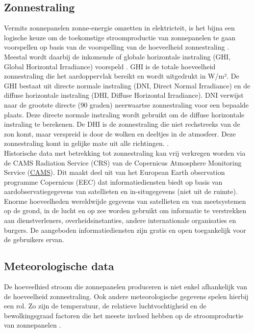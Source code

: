 \subsection{Zonnestraling}

Vermits zonnepanelen zonne-energie omzetten in elektricteit, is het bijna een logische keuze om de toekomstige stroomproductie van zonnepanelen te gaan voorspellen op basis van de voorspelling van de hoeveelheid zonnestraling \autocite{Ledmaoui2023}. Meestal wordt daarbij de inkomende of globale horizontale instraling (GHI, Global Horizontal Irradiance) voorspeld . GHI is de totale hoeveelheid zonnestraling die het aardoppervlak bereikt en wordt uitgedrukt in W/m². De GHI bestaat uit directe normale instraling (DNI, Direct Normal Irradiance)  en de diffuse horizontale instraling (DHI, Diffuse Horizontal Irradiance). DNI verwijst naar de grootste directe (90 graden) neerwaartse zonnestraling voor een bepaalde plaats. Deze directe normale instraling wordt gebruikt om de diffuse horizontale instraling te berekenen. De DHI is de zonnestraling die niet rechstreeks van de zon komt, maar verspreid is door de wolken en deeltjes in de atmosfeer. Deze zonnestraling komt in gelijke mate uit alle richtingen. \autocite{Sehrawat2023}. \\

Historische data met betrekking tot zonnestraling kan vrij verkregen worden via de CAMS Radiation Service (CRS) van de Copernicus Atmosphere Monitoring Service (\href{https://atmosphere.copernicus.eu}{CAMS}). Dit maakt deel uit van het European Earth observation programme Copernicus (EEC) dat informatiediensten biedt op basis van aardobservatiegegevens van satellieten en in-situgegevens (niet uit de ruimte). Enorme hoeveelheden wereldwijde gegevens van satellieten en van meetsystemen op de grond, in de lucht en op zee worden gebruikt om informatie te verstrekken aan dienstverleners, overheidsinstanties, andere internationale organisaties en burgers. De aangeboden informatiediensten zijn gratis en open toegankelijk voor de gebruikers ervan.

\subsection{Meteorologische data}

De hoeveelhied stroom die zonnepanelen produceren is niet enkel afhankelijk van de hoeveelheid zonnestraling. Ook andere meteorologische gegevens spelen hierbij een rol. Zo zijn de temperatuur, de relatieve luchtvochtigheid en de bewolkingsgraad factoren die het meeste invloed hebben op de stroomproductie van zonnepanelen \autocite{Sehrawat2023}. \\

